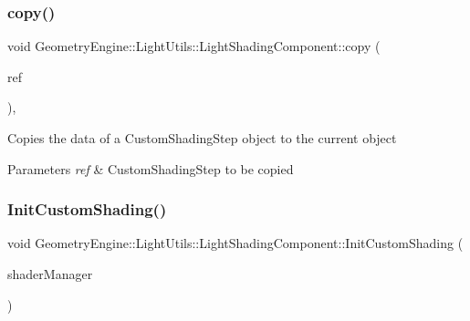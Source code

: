 \mbox{\label{class_geometry_engine_1_1_light_utils_1_1_light_shading_component_a1789add4c40a4d059f54fb7a25122700}} 
\subsubsection{\texorpdfstring{copy()}{copy()}}
{\footnotesize\ttfamily void Geometry\+Engine\+::\+Light\+Utils\+::\+Light\+Shading\+Component\+::copy (\begin{DoxyParamCaption}\item[{const \mbox{\hyperlink{class_geometry_engine_1_1_light_utils_1_1_light_shading_component}{Light\+Shading\+Component}} \&}]{ref }\end{DoxyParamCaption})\hspace{0.3cm}{\ttfamily [protected]}, {\ttfamily [virtual]}}

Copies the data of a Custom\+Shading\+Step object to the current object 
\begin{DoxyParams}{Parameters}
{\em ref} & Custom\+Shading\+Step to be copied \\
\hline
\end{DoxyParams}
\mbox{\label{class_geometry_engine_1_1_light_utils_1_1_light_shading_component_a481338e8a564f895b895b3234569df58}} 
\subsubsection{\texorpdfstring{InitCustomShading()}{InitCustomShading()}}
{\footnotesize\ttfamily void Geometry\+Engine\+::\+Light\+Utils\+::\+Light\+Shading\+Component\+::\+Init\+Custom\+Shading (\begin{DoxyParamCaption}\item[{\mbox{\hyperlink{class_shader_files_1_1_shader_manager}{Shader\+Files\+::\+Shader\+Manager}} $\ast$}]{shader\+Manager }\end{DoxyParamCaption})\hspace{0.3cm}{\ttfamily [virtual]}}

